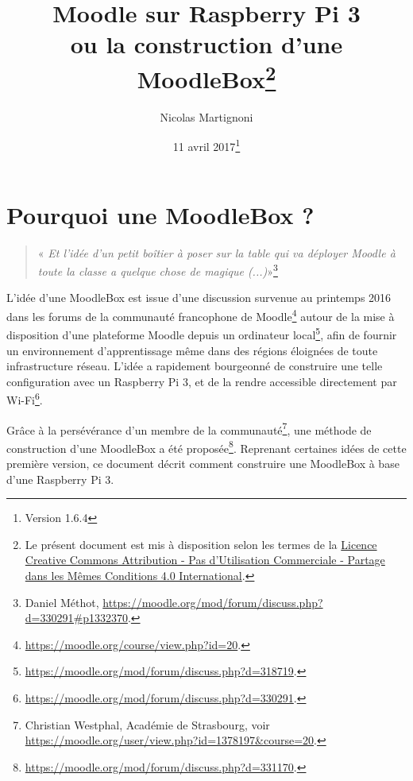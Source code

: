 \documentclass[11pt]{article}
\begin{document}
\title{Moodle sur Raspberry Pi 3\\ ou la construction d'une MoodleBox\footnote{Le présent document est mis à disposition selon les termes de la \href{http://creativecommons.org/licenses/by-nc-sa/4.0/}{Licence Creative Commons Attribution - Pas d'Utilisation Commerciale - Partage dans les Mêmes Conditions 4.0 International}.}}
\date{11 avril 2017\footnote{Version 1.6.4}} %
\author{Nicolas Martignoni}
\maketitle

\begingroup
\setlength{\parskip}{0pt}
\tableofcontents
\endgroup

\section{Pourquoi une MoodleBox ?}

\begin{quote}
\noindent « \emph{Et l'idée d'un petit boîtier à poser sur la table qui va déployer Moodle à toute la classe a quelque chose de magique (...)}»\footnote{Daniel Méthot, \url{https://moodle.org/mod/forum/discuss.php?d=330291\#p1332370}.}
\end{quote}

L'idée d'une MoodleBox est issue d'une discussion survenue au printemps 2016 dans les forums de la communauté francophone de Moodle\footnote{\url{https://moodle.org/course/view.php?id=20}.} autour de la mise à disposition d'une plateforme Moodle depuis un ordinateur local\footnote{\url{https://moodle.org/mod/forum/discuss.php?d=318719}.}, afin de fournir un environnement d'apprentissage même dans des régions éloignées de toute infrastructure réseau. L'idée a rapidement bourgeonné de construire une telle configuration avec un Raspberry Pi 3, et de la rendre accessible directement par Wi-Fi\footnote{\url{https://moodle.org/mod/forum/discuss.php?d=330291}.}.

Grâce à la persévérance d'un membre de la communauté\footnote{Christian Westphal, Académie de Strasbourg, voir \url{https://moodle.org/user/view.php?id=1378197&course=20}.}, une méthode de construction d'une MoodleBox a été proposée\footnote{\url{https://moodle.org/mod/forum/discuss.php?d=331170}.}. Reprenant certaines idées de cette première version, ce document décrit comment construire une MoodleBox à base d'une Raspberry Pi 3.
\end{document}

